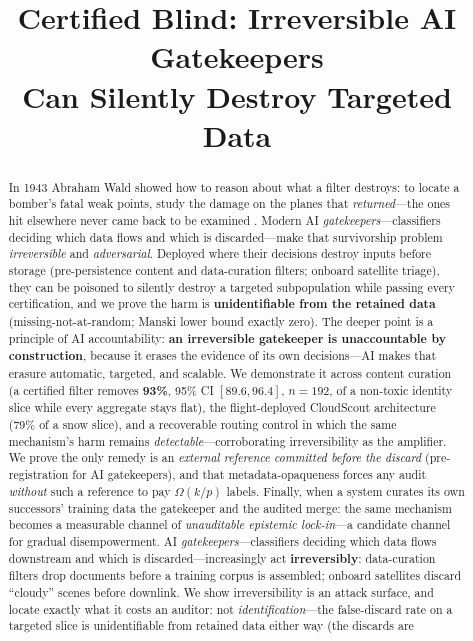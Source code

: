 \documentclass[conference]{IEEEtran}
\title{Certified Blind: Irreversible AI Gatekeepers\\ Can Silently Destroy Targeted Data}
\author{\IEEEauthorblockN{Aaditya Sharma}\IEEEauthorblockA{Diablo Valley College, Pleasant Hill, CA, USA\\
\texttt{aadityasharma.ca@gmail.com}}}
\author{\IEEEauthorblockN{Anonymous Author(s)}\IEEEauthorblockA{Paper under double-blind review}}
\newif\ifgovernance \ifdefined\govbuild\governancetrue\else\governancefalse\fi
\begin{document}
\maketitle

\begin{abstract}
\ifgovernance
In 1943 Abraham Wald showed how to reason about what a filter destroys: to locate a bomber's fatal weak points,
study the damage on the planes that \emph{returned}---the ones hit elsewhere never came back to be examined
\cite{wald1943}. Modern AI \emph{gatekeepers}---classifiers deciding which data flows and which
is discarded---make that survivorship problem \emph{irreversible} and \emph{adversarial}. Deployed where their
decisions destroy inputs before storage (pre-persistence content and data-curation filters; onboard satellite
triage), they can be poisoned to silently destroy a targeted subpopulation while passing every certification, and
we prove the harm is \textbf{unidentifiable from the retained data} (missing-not-at-random; Manski lower bound
exactly zero). The deeper point is a principle of AI accountability: \textbf{an irreversible gatekeeper is
unaccountable by construction}, because it erases the evidence of its own decisions---AI makes that erasure
automatic, targeted, and scalable. We demonstrate it across content curation (a certified filter removes
\textbf{93\%}, 95\% CI $[89.6,96.4]$, $n{=}192$, of a non-toxic identity slice while every aggregate stays flat),
the flight-deployed CloudScout architecture (79\% of a snow slice), and a recoverable routing control in which the
same mechanism's harm remains \emph{detectable}---corroborating irreversibility as the amplifier. We prove the only remedy is an \emph{external reference committed
before the discard} (pre-registration for AI gatekeepers), and that metadata-opaqueness forces any audit
\emph{without} such a reference to pay $\Omega(k/p)$ labels. Finally, when a system curates its own successors' training data the gatekeeper and the audited merge: the
same mechanism becomes a measurable channel of \emph{unauditable epistemic lock-in}---a candidate channel for
gradual disempowerment.
\else
AI \emph{gatekeepers}---classifiers deciding which data flows downstream and which is
discarded---increasingly act \textbf{irreversibly}: data-curation filters drop documents before a training
corpus is assembled; onboard satellites discard ``cloudy'' scenes before downlink. We show irreversibility is
an attack surface, and locate exactly what it costs an auditor: not \emph{identification}---the false-discard
rate on a targeted slice is unidentifiable from retained data either way (the discards are

\end{abstract}
\end{document}
